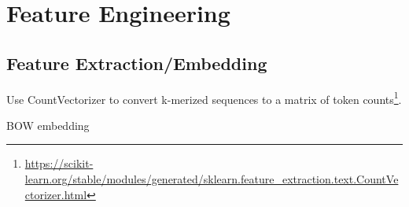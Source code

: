 \section{Feature Engineering}

\subsection{Feature Extraction/Embedding}

Use CountVectorizer to convert k-merized sequences to a matrix of token counts\footnote{\url{https://scikit-learn.org/stable/modules/generated/sklearn.feature_extraction.text.CountVectorizer.html}}.

BOW embedding

